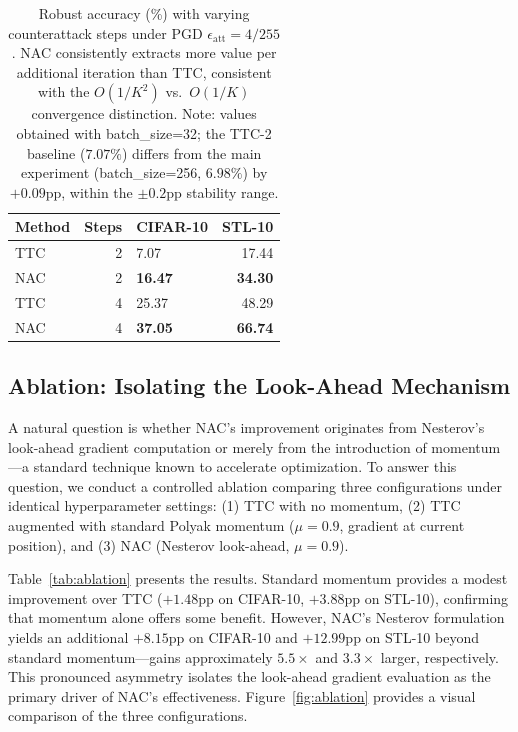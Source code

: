 \documentclass[pdflatex,sn-basic,Numbered]{sn-jnl}
\theoremstyle{thmstyleone}
\theoremstyle{thmstyletwo}
\theoremstyle{thmstylethree}
\begin{document}
\begin{table}[ht]\centering\small
\caption{Robust accuracy (\%) with varying counterattack steps under PGD $\epsilon_{\text{att}}=4/255$. NAC consistently extracts more value per additional iteration than TTC, consistent with the $O(1/K^2)$ vs.\ $O(1/K)$ convergence distinction. Note: values obtained with batch\_size=32; the TTC-2 baseline ($7.07\%$) differs from the main experiment (batch\_size=256, $6.98\%$) by $+0.09$pp, within the $\pm 0.2$pp stability range.}\label{tab:nstep}
\begin{tabular}{@{}lrlr@{}}
\toprule Method & Steps & CIFAR-10 & STL-10 \\
\midrule TTC & 2 & 7.07 & 17.44 \\
NAC & 2 & \textbf{16.47} & \textbf{34.30} \\
TTC & 4 & 25.37 & 48.29 \\
NAC & 4 & \textbf{37.05} & \textbf{66.74} \\
\bottomrule
\end{tabular}
\end{table}

\subsection{Ablation: Isolating the Look-Ahead Mechanism}\label{sec:ablation}

A natural question is whether NAC's improvement originates from Nesterov's look-ahead gradient computation or merely from the introduction of momentum---a standard technique known to accelerate optimization. To answer this question, we conduct a controlled ablation comparing three configurations under identical hyperparameter settings: (1) TTC with no momentum, (2) TTC augmented with standard Polyak momentum ($\mu=0.9$, gradient at current position), and (3) NAC (Nesterov look-ahead, $\mu=0.9$).

Table~\ref{tab:ablation} presents the results. Standard momentum provides a modest improvement over TTC ($+1.48$pp on CIFAR-10, $+3.88$pp on STL-10), confirming that momentum alone offers some benefit. However, NAC's Nesterov formulation yields an additional $+8.15$pp on CIFAR-10 and $+12.99$pp on STL-10 beyond standard momentum---gains approximately $5.5\times$ and $3.3\times$ larger, respectively. This pronounced asymmetry isolates the look-ahead gradient evaluation as the primary driver of NAC's effectiveness. Figure~\ref{fig:ablation} provides a visual comparison of the three configurations.
\end{document}
